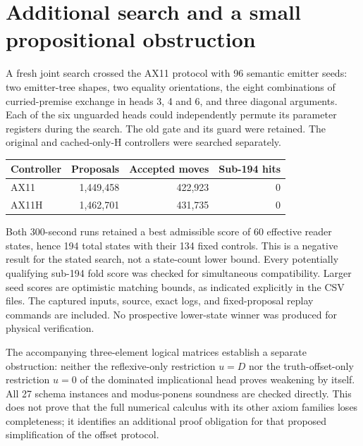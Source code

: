 \section{Additional search and a small propositional obstruction}
A fresh joint search crossed the AX11 protocol with 96 semantic emitter seeds:
two emitter-tree shapes, two equality orientations, the eight combinations of
curried-premise exchange in heads 3, 4 and 6, and three diagonal arguments.
Each of the six unguarded heads could independently permute its parameter
registers during the search. The old gate and its guard were retained.
The original and cached-only-H controllers were searched separately.

\begin{center}
\begin{tabular}{lrrr}
Controller & Proposals & Accepted moves & Sub-194 hits \\
\hline
AX11 & 1,449,458 & 422,923 & 0 \\
AX11H & 1,462,701 & 431,735 & 0
\end{tabular}
\end{center}

Both 300-second runs retained a best admissible score of 60 effective
reader states, hence 194 total states with their 134 fixed controls.
This is a negative result for the stated search, not a state-count lower
bound. Every potentially qualifying sub-194 fold score was checked for
simultaneous compatibility. Larger seed scores are optimistic matching
bounds, as indicated explicitly in the CSV files. The captured inputs,
source, exact logs, and fixed-proposal replay commands are included.
No prospective lower-state winner was produced for physical verification.

The accompanying three-element logical matrices establish a separate
obstruction: neither the reflexive-only restriction $u=D$ nor the
truth-offset-only restriction $u=0$ of the dominated implicational head
proves weakening by itself. All 27 schema instances and modus-ponens
soundness are checked directly. This does not prove that the full
numerical calculus with its other axiom families loses completeness;
it identifies an additional proof obligation for that proposed
simplification of the offset protocol.

